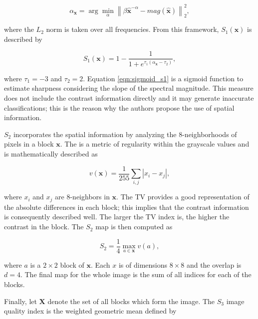 \begin{equation}
\label{eqn:slope_of_magnitude}
\alpha_{\mathbf{x}} = \arg \min_{\alpha} \left\lVert \beta \hat{\mathbf{x}}^{-\alpha} -  mag(\hat{\mathbf{x}}) \right\rVert^{2}_{2},
\end{equation}

\noindent where the $L_{2}$ norm is taken over all frequencies. From this framework, $S_{1}(\mathbf{x})$ is described by

\begin{equation}
\label{eqn:sigmoid_s1}
S_{1}(\mathbf{x}) = 1 - \frac{1}{1 + e^{\tau_{1}
(\alpha_{\mathbf{x}} - \tau_{2})}},
\end{equation}

\noindent where $\tau_{1} = -3$ and $\tau_{2} = 2$. Equation \ref{eqn:sigmoid_s1} is a sigmoid function to estimate sharpness considering the slope of the spectral magnitude. This measure does not include the contrast information directly and it may generate inaccurate classifications; this is the reason why the authors propose the use of spatial information.

$S_{2}$ incorporates the spatial information by analyzing the 8-neighborhoods of pixels in a block $\mathbf{x}$. The  is a metric of regularity within the grayscale values and is mathematically described as

\begin{equation}
\label{eqn:total_variation}
v(\mathbf{x}) = \frac{1}{255}\sum_{i,j}\left|x_{i} - x_{j}\right|,
\end{equation}

\noindent where $x_{i}$ and $x_{j}$ are 8-neighbors in $\mathbf{x}$. The TV provides a good representation of the absolute differences in each block; this implies that the contrast information is consequently described well. The larger the TV index is, the higher the contrast in the block. The $S_{2}$ map is then computed as

\begin{equation}
\label{eqn:spatial_s2}
S_{2} = \frac{1}{4} \max_{a \in \mathbf{x}} v(a),
\end{equation}

\noindent where $a$ is a $2 \times 2$ block of $\mathbf{x}$. Each $x$ is of dimensions $8 \times 8$ and the overlap is $d = 4$. The final map for the whole image is the sum of all indices for each of the blocks.

Finally, let $\mathbf{X}$ denote the set of all blocks which form the image. The $S_{3}$ image quality index is the weighted geometric mean defined by

